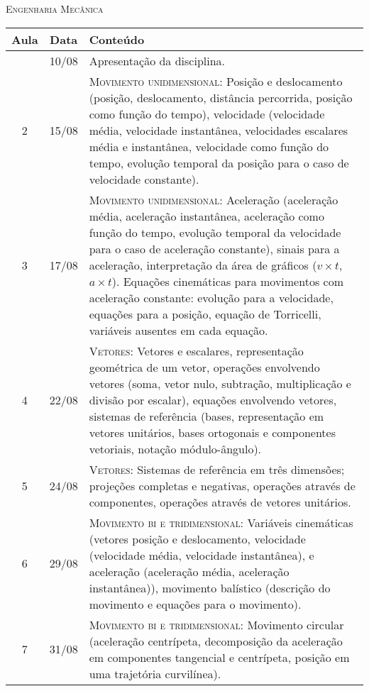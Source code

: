 \vspace{1cm}
\begin{center}
\Large\textsc{Engenharia Mecânica}
\end{center}
\begin{center}
\begin{longtable}{ccp{70mm}}
\toprule
Aula & Data & Conteúdo \\
\midrule
\endhead
\bottomrule
\endfoot
1	 & 	10/08	 & 	Apresentação da disciplina. \\
2	 & 	15/08	 & 	\textsc{Movimento unidimensional:} Posição e deslocamento (posição, deslocamento, distância percorrida, posição como função do tempo), velocidade (velocidade média, velocidade instantânea, velocidades escalares média e instantânea, velocidade como função do tempo, evolução temporal da posição para o caso de velocidade constante). \\
3	 & 	17/08	 & 	\textsc{Movimento unidimensional:} Aceleração (aceleração média, aceleração instantânea, aceleração como função do tempo, evolução temporal da velocidade para o caso de aceleração constante), sinais para a aceleração, interpretação da área de gráficos ($v \times t$, $a \times  t$). Equações cinemáticas para movimentos com aceleração constante: evolução para a velocidade, equações para a posição, equação de Torricelli, variáveis ausentes em cada equação. \\
4	 & 	22/08	 & 	\textsc{Vetores:} Vetores e escalares, representação geométrica de um vetor, operações envolvendo vetores (soma, vetor nulo, subtração, multiplicação e divisão por escalar), equações envolvendo vetores, sistemas de referência (bases, representação em vetores unitários, bases ortogonais e componentes vetoriais, notação módulo-ângulo). \\
5	 & 	24/08	 &  \textsc{Vetores:} Sistemas de referência em três dimensões; projeções completas e negativas, operações através de componentes, operações através de vetores unitários. \\
6	 & 	29/08	 & 	\textsc{Movimento bi e tridimensional:} Variáveis cinemáticas (vetores posição e deslocamento, velocidade (velocidade média, velocidade instantânea), e aceleração (aceleração média, aceleração instantânea)), movimento balístico (descrição do movimento e equações para o movimento). \\
7	 & 	31/08	 & 	\textsc{Movimento bi e tridimensional:} Movimento circular (aceleração centrípeta, decomposição da aceleração em componentes tangencial e centrípeta, posição em uma trajetória curvilínea). \\

\end{longtable}
\end{center}
